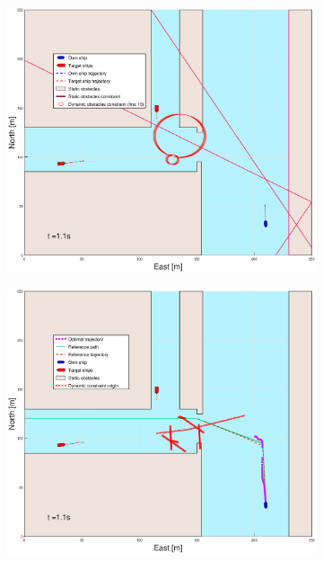 \begin{figure}[!b]
\begin{subfigure}[b]{0.499\textwidth}
    \end{subfigure}
    \hfill
    \\
    \begin{subfigure}[b]{0.49\textwidth}
        \centering
        \includegraphics[width=\textwidth]{Images/Figures/Havn1/_Simple_0fig1_time=1}
    \end{subfigure}
    \hfill
    \begin{subfigure}[b]{0.499\textwidth}
        \centering
        \includegraphics[width=\textwidth]{Images/Figures/Havn1/_Simple_0fig999_time=1}

\end{subfigure}
\end{figure}
